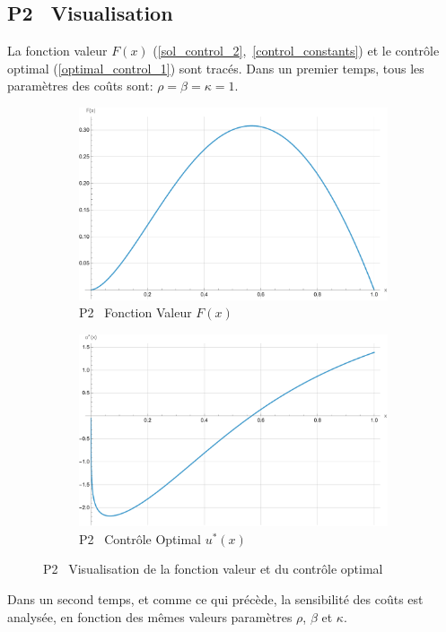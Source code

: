 \subsection{P2 \textemdash~Visualisation}
La fonction valeur $F(x)$ (\ref{sol_control_2},~\ref{control_constants}) et le contrôle optimal (\ref{optimal_control_1}) sont tracés. Dans un premier temps, tous les paramètres des coûts sont: $\rho=\beta=\kappa=1$.
\begin{figure}[htb]
    \centering
    \begin{subfigure}{0.45\linewidth}
        \includegraphics[width=\linewidth]{img/validation/P2/p2_value.pdf}
        \caption{P2 \textemdash~Fonction Valeur $F(x)$}\label{fig:ValueVisualisation2}
    \end{subfigure}
    \hfill
    \begin{subfigure}{0.45\linewidth}
        \includegraphics[width=\linewidth]{img/validation/P2/p2_control.pdf}
        \caption{P2 \textemdash~Contrôle Optimal $u^*(x)$}\label{fig:ControlVisualisation2}
    \end{subfigure}
    \caption{P2 \textemdash~Visualisation de la fonction valeur et du contrôle optimal}\label{fig:ValueControlComparison2}
\end{figure}\FloatBarrier Dans un second temps, et comme ce qui précède, la sensibilité des coûts est analysée, en fonction des mêmes valeurs paramètres $\rho$, $\beta$ et $\kappa$.
